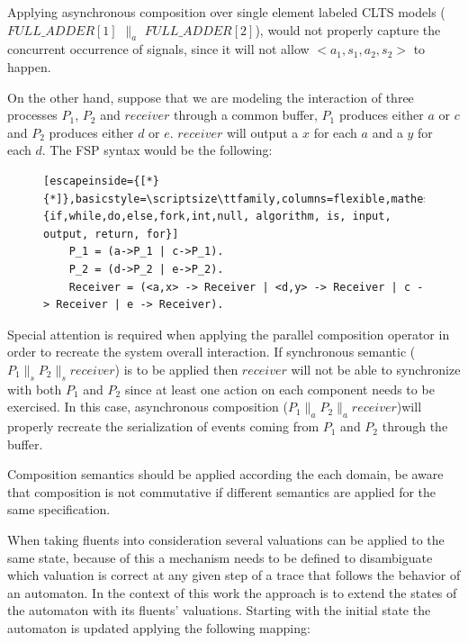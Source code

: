 Applying asynchronous composition over single element labeled CLTS models ($FULL\_ADDER[1]$ $\parallel_{a}$ $FULL\_ADDER[2]$), would not properly capture the concurrent occurrence of signals, since it will not allow $<a_1,s_1,a_2,s_2>$ to happen.  

On the other hand, suppose that we are modeling the interaction of three processes $P_1$, $P_2$ and $receiver$ through a common buffer, $P_1$ produces either $a$ or $c$ and
$P_2$ produces either $d$ or $e$. $receiver$ will output a $x$ for each $a$ and a $y$ for each $d$. The FSP syntax would be the following:

\renewcommand{\ttdefault}{pcr}
\begin{figure}[H]
	\begin{lstlisting}[escapeinside={[*}{*]},basicstyle=\scriptsize\ttfamily,columns=flexible,mathescape=true,xleftmargin=3.0ex,keywordstyle=\textbf,morekeywords={if,while,do,else,fork,int,null, algorithm, is, input, output, return, for}]
	P_1 = (a->P_1 | c->P_1).
	P_2 = (d->P_2 | e->P_2).
	Receiver = (<a,x> -> Receiver | <d,y> -> Receiver | c -> Receiver | e -> Receiver).
	\end{lstlisting}
	\label{fig:receiver_fsp}
	\MediumPicture
\end{figure}

Special attention is required when applying the parallel composition operator in order to recreate the system overall interaction. If synchronous semantic ($P_1\parallel_s P_2 \parallel_s receiver$) is to be applied then $receiver$ will not be able to synchronize with both $P_1$ and $P_2$ since at least one action on each component needs to be exercised. In this case, asynchronous composition ($P_1\parallel_a P_2 \parallel_a receiver$)will properly recreate the serialization of events coming from $P_1$ and $P_2$ through the buffer.

Composition semantics should be applied according the each domain, be aware that composition is not commutative if different semantics are applied for the same specification.










When taking fluents into consideration several valuations can be applied to the same state, because of this a mechanism needs to be defined to disambiguate which valuation is correct at any given step of a trace that follows the behavior of an automaton.
In the context of this work the approach is to extend the states of the automaton with its fluents' valuations. Starting with the initial state the automaton is updated applying the following mapping:

